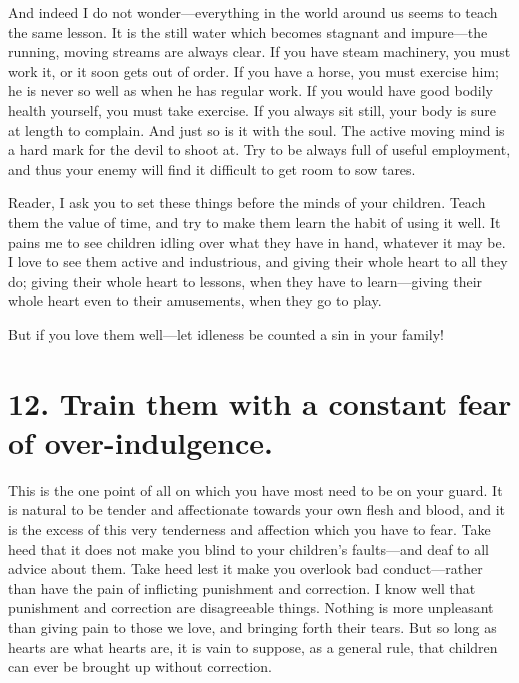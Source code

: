 \documentclass[
]{book}
\begin{document}
And indeed I do not wonder---everything in the world around us seems to teach the same lesson. It is the still water which becomes stagnant and impure---the running, moving streams are always clear. If you have steam machinery, you must work it, or it soon gets out of order. If you have a horse, you must exercise him; he is never so well as when he has regular work. If you would have good bodily health yourself, you must take exercise. If you always sit still, your body is sure at length to complain. And just so is it with the soul. The active moving mind is a hard mark for the devil to shoot at. Try to be always full of useful employment, and thus your enemy will find it difficult to get room to sow tares.

Reader, I ask you to set these things before the minds of your children. Teach them the value of time, and try to make them learn the habit of using it well. It pains me to see children idling over what they have in hand, whatever it may be. I love to see them active and industrious, and giving their whole heart to all they do; giving their whole heart to lessons, when they have to learn---giving their whole heart even to their amusements, when they go to play.

But if you love them well---let idleness be counted a sin in your family!

\hypertarget{train-them-with-a-constant-fear-of-over-indulgence.}{%
\section*{12. Train them with a constant fear of over-indulgence.}\label{train-them-with-a-constant-fear-of-over-indulgence.}}

This is the one point of all on which you have most need to be on your guard. It is natural to be tender and affectionate towards your own flesh and blood, and it is the excess of this very tenderness and affection which you have to fear. Take heed that it does not make you blind to your children's faults---and deaf to all advice about them. Take heed lest it make you overlook bad conduct---rather than have the pain of inflicting punishment and correction. I know well that punishment and correction are disagreeable things. Nothing is more unpleasant than giving pain to those we love, and bringing forth their tears. But so long as hearts are what hearts are, it is vain to suppose, as a general rule, that children can ever be brought up without correction.
\end{document}
